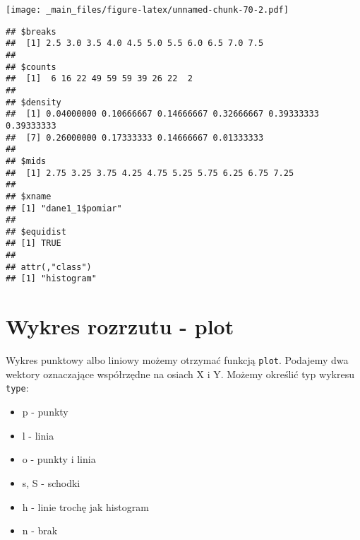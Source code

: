 \documentclass[
]{book}
\newenvironment{Shaded}{\begin{snugshade}}{\end{snugshade}}
\newcommand{\AttributeTok}[1]{\textcolor[rgb]{0.77,0.63,0.00}{#1}}
\newcommand{\CommentTok}[1]{\textcolor[rgb]{0.56,0.35,0.01}{\textit{#1}}}
\newcommand{\ConstantTok}[1]{\textcolor[rgb]{0.00,0.00,0.00}{#1}}
\newcommand{\DecValTok}[1]{\textcolor[rgb]{0.00,0.00,0.81}{#1}}
\newcommand{\FunctionTok}[1]{\textcolor[rgb]{0.00,0.00,0.00}{#1}}
\newcommand{\NormalTok}[1]{#1}
\newcommand{\SpecialCharTok}[1]{\textcolor[rgb]{0.00,0.00,0.00}{#1}}
\newcommand{\StringTok}[1]{\textcolor[rgb]{0.31,0.60,0.02}{#1}}
\begin{document}
\begin{Shaded}
\end{Shaded}

\texttt{[image: \_main\_files/figure-latex/unnamed-chunk-70-2.pdf]}

\begin{Shaded}
\end{Shaded}

\begin{verbatim}
## $breaks
##  [1] 2.5 3.0 3.5 4.0 4.5 5.0 5.5 6.0 6.5 7.0 7.5
## 
## $counts
##  [1]  6 16 22 49 59 59 39 26 22  2
## 
## $density
##  [1] 0.04000000 0.10666667 0.14666667 0.32666667 0.39333333 0.39333333
##  [7] 0.26000000 0.17333333 0.14666667 0.01333333
## 
## $mids
##  [1] 2.75 3.25 3.75 4.25 4.75 5.25 5.75 6.25 6.75 7.25
## 
## $xname
## [1] "dane1_1$pomiar"
## 
## $equidist
## [1] TRUE
## 
## attr(,"class")
## [1] "histogram"
\end{verbatim}

\hypertarget{wykres-rozrzutu---plot}{%
\section{Wykres rozrzutu - plot}\label{wykres-rozrzutu---plot}}

Wykres punktowy albo liniowy możemy otrzymać funkcją \texttt{plot}. Podajemy dwa wektory oznaczające współrzędne na osiach X i Y. Możemy określić typ wykresu \texttt{type}:

\begin{itemize}
\item
  p - punkty
\item
  l - linia
\item
  o - punkty i linia
\item
  s, S - schodki
\item
  h - linie trochę jak histogram
\item
  n - brak
\end{itemize}
\end{document}
